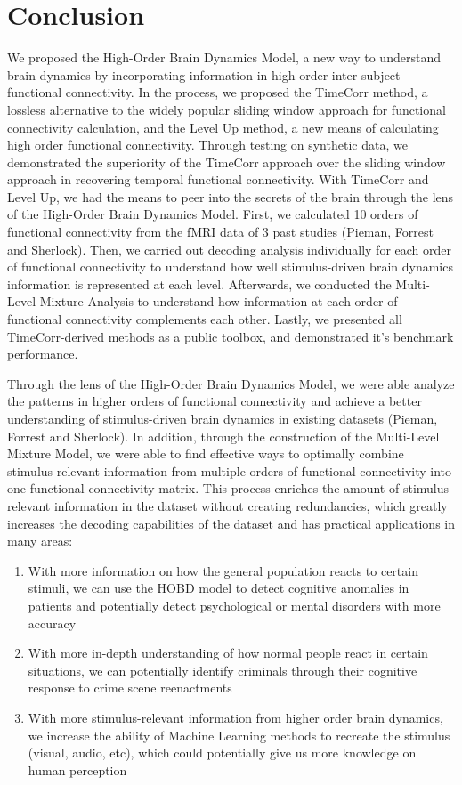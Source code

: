 \documentclass[11pt]{article}
\begin{document}
\section{Conclusion}
We proposed the High-Order Brain Dynamics Model, a new way to understand brain dynamics by incorporating information in high order inter-subject functional connectivity. In the process, we proposed the TimeCorr method, a lossless alternative to the widely popular sliding window approach for functional connectivity calculation, and the Level Up method, a new means of calculating high order functional connectivity. Through testing on synthetic data, we demonstrated the superiority of the TimeCorr approach over the sliding window approach in recovering temporal functional connectivity. With TimeCorr and Level Up, we had the means to peer into the secrets of the brain through the lens of the High-Order Brain Dynamics Model. First, we calculated 10 orders of functional connectivity from the fMRI data of 3 past studies (Pieman, Forrest and Sherlock). Then, we carried out decoding analysis individually for each order of functional connectivity to understand how well stimulus-driven brain dynamics information is represented at each level. Afterwards, we conducted the Multi-Level Mixture Analysis to understand how information at each order of functional connectivity complements each other. Lastly, we presented all TimeCorr-derived methods as a public toolbox, and demonstrated it's benchmark performance.

Through the lens of the High-Order Brain Dynamics Model, we were able analyze the patterns in higher orders of functional connectivity and achieve a better understanding of stimulus-driven brain dynamics in existing datasets (Pieman, Forrest and Sherlock). In addition, through the construction of the Multi-Level Mixture Model, we were able to find effective ways to optimally combine stimulus-relevant information from multiple orders of functional connectivity into one functional connectivity matrix. This process enriches the amount of stimulus-relevant information in the dataset without creating redundancies, which greatly increases the decoding capabilities of the dataset and has practical applications in many areas:

\begin{enumerate}
\item With more information on how the general population reacts to certain stimuli, we can use the HOBD model to detect cognitive anomalies in patients and potentially detect psychological or mental disorders with more accuracy
\item With more in-depth understanding of how normal people react in certain situations, we can potentially identify criminals through their cognitive response to crime scene reenactments
\item With more stimulus-relevant information from higher order brain dynamics, we increase the ability of  Machine Learning methods to recreate the stimulus (visual, audio, etc), which could potentially give us more knowledge on human perception
\end{enumerate}
\end{document}
